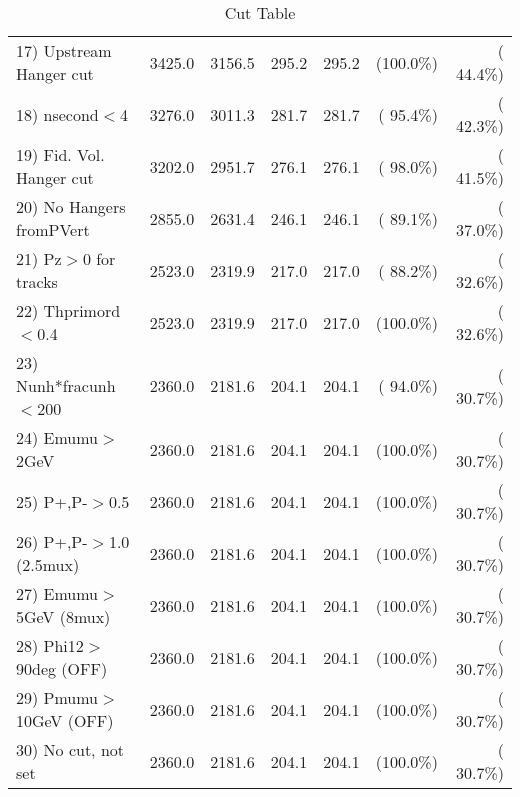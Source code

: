 \begin{table}[h!]
\begin{tabular}{||l||r|r|r|r|r|r||}
 17) Upstream Hanger cut  &       3425.0 &       3156.5 &        295.2 &        295.2 & (100.0\%) & ( 44.4\%) \\
 18) nsecond$<$4          &       3276.0 &       3011.3 &        281.7 &        281.7 & ( 95.4\%) & ( 42.3\%) \\
 19) Fid. Vol. Hanger cut &       3202.0 &       2951.7 &        276.1 &        276.1 & ( 98.0\%) & ( 41.5\%) \\
 20) No Hangers fromPVert &       2855.0 &       2631.4 &        246.1 &        246.1 & ( 89.1\%) & ( 37.0\%) \\
 21) Pz$>$0 for tracks    &       2523.0 &       2319.9 &        217.0 &        217.0 & ( 88.2\%) & ( 32.6\%) \\
 22) Thprimord$<$0.4      &       2523.0 &       2319.9 &        217.0 &        217.0 & (100.0\%) & ( 32.6\%) \\
 23) Nunh*fracunh$<$200   &       2360.0 &       2181.6 &        204.1 &        204.1 & ( 94.0\%) & ( 30.7\%) \\
 24) Emumu$>$2GeV         &       2360.0 &       2181.6 &        204.1 &        204.1 & (100.0\%) & ( 30.7\%) \\
 25) P+,P-$>$0.5          &       2360.0 &       2181.6 &        204.1 &        204.1 & (100.0\%) & ( 30.7\%) \\
 26) P+,P-$>$1.0 (2.5mux) &       2360.0 &       2181.6 &        204.1 &        204.1 & (100.0\%) & ( 30.7\%) \\
 27) Emumu$>$5GeV  (8mux) &       2360.0 &       2181.6 &        204.1 &        204.1 & (100.0\%) & ( 30.7\%) \\
 28) Phi12$>$90deg  (OFF) &       2360.0 &       2181.6 &        204.1 &        204.1 & (100.0\%) & ( 30.7\%) \\
 29) Pmumu$>$10GeV  (OFF) &       2360.0 &       2181.6 &        204.1 &        204.1 & (100.0\%) & ( 30.7\%) \\
 30) No cut, not set      &       2360.0 &       2181.6 &        204.1 &        204.1 & (100.0\%) & ( 30.7\%) \\
 \hline
 \hline
 \end{tabular}
 \caption{Cut Table           }
 \label{tab-cutcohjpsi-mumu_anumucc}
 \end{table}
